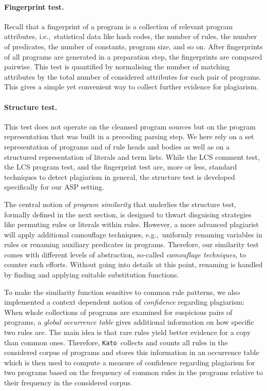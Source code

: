 \documentclass{tlp}
\newcommand{\iec}[0]{i.e.,\ }
\newcommand{\egc}[0]{e.g.,\ }
\newcommand{\kato}[0]{\texttt{Kato}\xspace}
\begin{document}
\paragraph{Fingerprint test.}
Recall that a fingerprint of a program is a collection of relevant program attributes, \iec statistical data like 
hash codes, the number of rules, the number of predicates, the number of constants, program size, and so
on. After fingerprints of all programs are generated in a preparation step, the fingerprints are compared
pairwise. 
This test is quantified by normalising the number of matching attributes by the total number of considered attributes for each pair
of programs.
This gives a simple yet convenient way to collect further evidence for plagiarism.

\paragraph{Structure test.}
This test does not operate on the cleansed program sources but on the program representation that was built in
a preceding parsing step.
We here rely on a set representation of programs and of rule heads and bodies as well as on a structured representation of literals and term lists.
While the LCS comment test, the LCS program test, and the fingerprint test are, more or less, standard techniques to detect plagiarism in general, the structure test is developed specifically for our ASP setting.

The central notion of \emph{program similarity}  that underlies  
the structure test,  formally defined in the next section,
is designed to thwart disguising strategies like permuting rules or literals
within rules. 
However, a more advanced plagiarist will apply additional camouflage techniques, \egc  uniformly renaming variables in rules or renaming auxiliary predicates in programs. 
Therefore, our similarity test comes with different levels of abstraction, so-called \emph{camouflage techniques}, to counter such efforts.
Without going into details at this point, renaming is handled by finding and applying suitable substitution functions.

To make the similarity function sensitive to common rule patterns, we also implemented a context dependent notion 
of \emph{confidence}
regarding plagiarism:
When whole collections of programs are examined for suspicious pairs of programs,
a \emph{global occurrence table} gives
additional information on how specific two rules are. The main idea is that rare rules yield better evidence for a copy than common ones. Therefore, \kato\ collects and counts all rules
in the considered corpus of programs
and stores this information in an {occurrence table} which is then used to compute a measure of confidence regarding
plagiarism for two programs based on the frequency of common rules in the programs relative to their frequency in the
considered corpus. 
\end{document}
